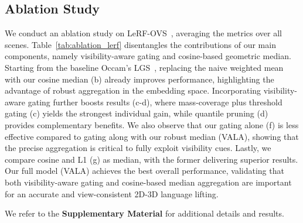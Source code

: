 \subsection{Ablation Study}
We conduct an ablation study on LeRF-OVS~\cite{qin2024langsplat}, averaging the metrics over all scenes. Table~\ref{tab:ablation_lerf} disentangles the contributions of our main components, namely visibility-aware gating and cosine-based geometric median. Starting from the baseline Occam's LGS~\cite{cheng2024occam}, replacing the naive weighted mean with our cosine median (b) already improves performance, highlighting the advantage of robust aggregation in the embedding space. Incorporating visibility-aware gating further boosts results (c-d), where mass-coverage plus threshold gating (c) yields the strongest individual gain, while quantile pruning (d) provides complementary benefits. We also observe that our gating alone (f) is less effective compared to gating along with our robust median (VALA), showing that the precise aggregation is critical to fully exploit visibility cues. Lastly, we compare cosine and L1 (g) as median, with the former delivering superior results. Our full model (VALA) achieves the best overall performance, validating that both visibility-aware gating and cosine-based median aggregation are important for an accurate and view-consistent 2D-3D language lifting.

We refer to the \textbf{Supplementary Material} for additional details and results.